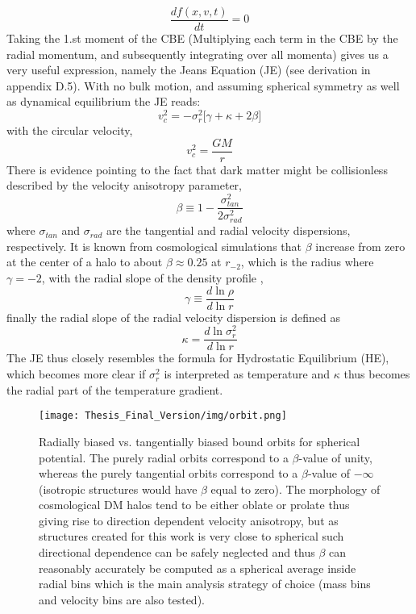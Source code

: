 \begin{equation}
\frac{df(x,v,t)}{dt} = 0 
\end{equation}
Taking the 1.st moment of the CBE (Multiplying each term in the CBE by the radial momentum, and subsequently integrating over all momenta) gives us a very useful expression, namely the Jeans Equation (JE) (see derivation in appendix D.5). With no bulk motion, and assuming spherical symmetry as well as dynamical equilibrium the JE reads:
\begin{equation}
v_c^2 = -\sigma_r^2  \big[\gamma +\kappa +2 \beta \big] 
\end{equation}
with the circular velocity,
\begin{equation}
v_c^2 = \frac{GM}{r}
\end{equation}
There is evidence pointing to the fact that dark matter might be collisionless described by the velocity anisotropy parameter, 
\begin{equation}
\beta \equiv 1 - \frac{\sigma_{tan}^2}{2 \sigma_{rad}^2} 
\end{equation}
where $\sigma_{tan}$ and $\sigma_{rad}$ are the tangential and radial velocity dispersions, respectively. It is known from cosmological simulations that $\beta$ increase from zero at the center of a halo to about $\beta \approx 0.25$ at $r_{-2}$, which is the radius where $\gamma = -2$, with the radial slope of the density profile , 
\begin{equation}
\gamma \equiv \frac{d\ln\rho}{d\ln r}
\end{equation}
finally the radial slope of the radial velocity dispersion is defined as
\begin{equation}
\kappa = \frac{d\ln\sigma_r^2}{d\ln r} 
\end{equation}
The JE thus closely resembles the formula for Hydrostatic Equilibrium (HE), which becomes more clear if $\sigma_r^2$ is interpreted as temperature and $\kappa$ thus becomes the radial part of the temperature gradient. 

\begin{figure}[!htbp]
\centering
\texttt{[image: Thesis\_Final\_Version/img/orbit.png]}
\caption{Radially biased vs. tangentially biased bound orbits for spherical potential. The purely radial orbits correspond to a $\beta$-value of unity, whereas the purely tangential orbits correspond to a $\beta$-value of $- \infty$ (isotropic structures would have $\beta$ equal to zero). The morphology of cosmological DM halos tend to be either oblate or prolate thus giving rise to direction dependent velocity anisotropy, but as structures created for this work is very close to spherical such directional dependence can be safely neglected and thus $\beta$ can reasonably accurately be computed as a spherical average inside radial bins which is the main analysis strategy of choice (mass bins and velocity bins are also tested).}
\label{fig:test}
\end{figure}

